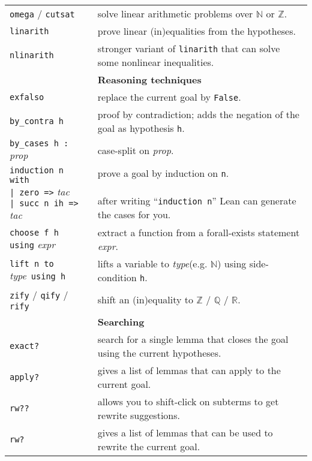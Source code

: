 \documentclass[a4paper]{article}
\newcommand{\lean}[1]{{\tt #1}}
\newcommand{\expr}[1][]{\textit{expr#1}\xspace}
\newcommand{\proposition}{\textit{prop}\xspace}
\newcommand{\tactic}[1][]{\textit{tac#1}\xspace} %
\newcommand{\type}{\textit{type}\xspace}
\newcommand{\light}{\faLightbulbO\xspace}
\begin{document}
\begin{center}
\begin{longtable}{@{}lp{113mm}@{}}
  \lean{omega} / \lean{cutsat} & solve linear arithmetic problems over $\mathbb{N}$ or $\mathbb{Z}$. \\
  \lean{linarith} & prove linear (in)equalities from the hypotheses. \\
  \lean{nlinarith} & stronger variant of \lean{linarith} that can solve some nonlinear inequalities. \\
  \hline
  &\textbf{Reasoning techniques}\\
  \lean{exfalso} & replace the current goal by \lean{False}. \\
  \lean{by\_contra h} & proof by contradiction; adds the negation of the goal as hypothesis \lean{h}.\\
  \lean{by\_cases h :} \proposition & case-split on \proposition. \\
  \makecell[lt]{\lean{induction n with }\\ \lean{| zero      =>} \tactic \\ \lean{| succ n ih =>} \tactic} &
  \makecell[lt]{prove a goal by induction on \lean{n}.\\ \\ \light after writing ``\lean{induction n}'' Lean can generate the cases for you.} \\
  \lean{choose f h using} \expr & extract a function from a forall-exists statement \expr.\\
  \lean{lift n to} \type\ \lean{using h} & lifts a variable to \type (e.g. $\mathbb{N}$) using side-condition \lean{h}.\\
  \lean{zify} / \lean{qify} / \lean{rify} & shift an (in)equality to $\mathbb{Z}$ / $\mathbb{Q}$ / $\mathbb{R}$. \\
  \hline
  &\textbf{Searching}\\
  \lean{exact?} & search for a single lemma that closes the goal using the current hypotheses. \\
  \lean{apply?} & gives a list of lemmas that can apply to the current goal. \\
  \lean{rw??} & allows you to shift-click on subterms to get rewrite suggestions. \\
  \lean{rw?} & gives a list of lemmas that can be used to rewrite the current goal. \\

\end{longtable}
\end{center}
\end{document}

